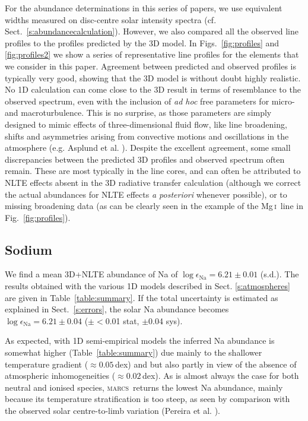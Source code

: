 \documentclass[traditabstract]{aa}
\newcommand{\marcs}{\textsc{marcs}}
\newcommand{\altmgi}{Mg\,\textsc{i}}
\newcommand{\mgi}{\altmgi\ }
\begin{document}
For the abundance determinations in this series of papers, we use equivalent widths measured on disc-centre solar intensity spectra (cf. Sect.\ \ref{s:abundancecalculation}). However, we also compared all the observed line profiles to the profiles predicted by the 3D model. In Figs.~\ref{fig:profiles} and \ref{fig:profiles2} we show a series of representative line profiles for the elements that we consider in this paper. Agreement between predicted and observed profiles is typically very good, showing that the 3D model is without doubt highly realistic.  No 1D calculation can come close to the 3D result in terms of resemblance to the observed spectrum, even with the inclusion of \textit{ad hoc} free parameters for micro- and macroturbulence.  This is no surprise, as those parameters are simply designed to mimic effects of three-dimensional fluid flow, like line broadening, shifts and asymmetries arising from convective motions and oscillations in the atmosphere (e.g. Asplund et al. \cite{asp1}).  Despite the excellent agreement, some small discrepancies between the predicted 3D profiles and observed spectrum often remain.  These are most typically in the line cores, and can often be attributed to NLTE effects absent in the 3D radiative transfer calculation (although we correct the actual abundances for NLTE effects \textit{a posteriori} whenever possible), or to missing broadening data (as can be clearly seen in the example of the \mgi line in Fig.~\ref{fig:profiles}).


\subsection{Sodium}
We find a mean 3D+NLTE abundance of Na of $\log\epsilon_{\mathrm{Na}}= 6.21 \pm 0.01$ (s.d.). The results obtained with the various 1D models described in Sect. \ref{s:atmospheres} are given in Table~\ref{table:summary}. If the total uncertainty is estimated as explained in Sect.~\ref{s:errors}, the solar Na abundance becomes $\log\epsilon_{\mathrm{Na}} = 6.21 \pm 0.04$ ($\pm$$<$0.01 stat, $\pm$0.04 sys).

As expected, with 1D semi-empirical models the inferred Na abundance is somewhat higher (Table~\ref{table:summary}) due mainly to the shallower temperature gradient ($\approx$$0.05$\,dex) and but also partly in view of the absence of atmospheric inhomogeneities ($\approx$$0.02$\,dex). As is almost always the case for both neutral and ionised species, \marcs\ returns the lowest Na abundance, mainly because its temperature stratification is too steep, as seen by comparison with the observed solar centre-to-limb variation (Pereira et al. \cite{pereira_models}).
\end{document}
